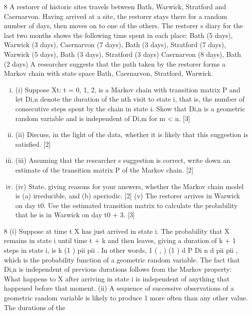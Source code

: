 \documentclass[a4paper,12pt]{article}
\begin{document}
\begin{enumerate}
8 A restorer of historic sites travels between Bath, Warwick, Stratford and Caernarvon.
Having arrived at a site, the restorer stays there for a random number of days, then
moves on to one of the others. The restorer s diary for the last two months shows the following time spent in each place:
Bath (5 days), Warwick (3 days), Caernarvon (7 days), Bath (3 days),
Stratford (7 days), Warwick (5 days), Bath (3 days), Stratford (3 days)
Caernarvon (8 days), Bath (2 days)
A researcher suggests that the path taken by the restorer forms a Markov chain with state space {Bath, Caernarvon, Stratford, Warwick}.

\begin{enumerate}[(i)]
\item (i) Suppose {Xt: t = 0, 1, 2, } is a Markov chain with transition matrix P and let Di,n denote the duration of the nth visit to state i, that is, the number of
consecutive steps spent by the chain in state i. Show that Di,n is a geometric
random variable and is independent of Di,m for m < n. [3]
\item (ii) Discuss, in the light of the data, whether it is likely that this suggestion is
satisfied. [2]
\item (iii) Assuming that the researcher s suggestion is correct, write down an estimate
of the transition matrix P of the Markov chain. [2]
\item (iv) State, giving reasons for your answers, whether the Markov chain model is
(a) irreducible, and (b) aperiodic. [2]
(v) The restorer arrives in Warwick on day t0. Use the estimated transition matrix
to calculate the probability that he is in Warwick on day t0 + 3. [3]
\end{enumerate}
8 (i) Suppose at time t X has just arrived in state i. The probability that X remains
in state i until time t + k and then leaves, giving a duration of k + 1 steps in state i, is k (1 )
pii pii . In other words, 1
( , ) (1 ) d
P Di n d pii pii , which is
the probability function of a geometric random variable.
The fact that Di,n is independent of previous durations follows from the Markov property: What happens to X after arriving in state i is independent of anything that happened before that moment.
(ii) A sequence of successive observations of a geometric random variable is likely to produce 1 more often than any other value. The durations of the

\end{enumerate}
\end{document}
